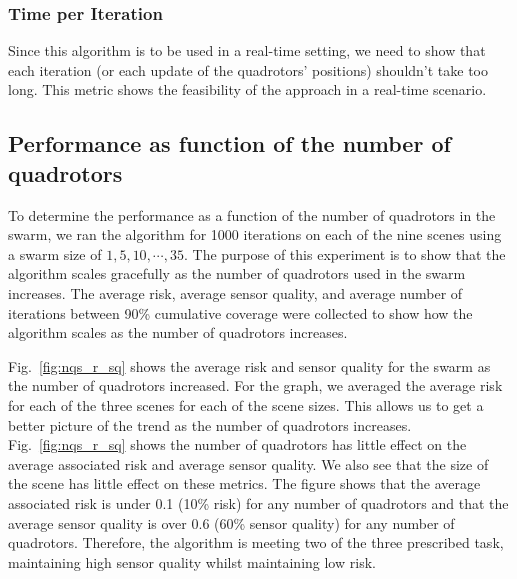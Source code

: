 \documentclass{article}
\begin{document}
\subsubsection{Time per Iteration}

Since this algorithm is to be used in a real-time setting, we need to show that
each iteration (or each update of the quadrotors' positions) shouldn't take too
long. This metric shows the feasibility of the approach in a real-time
scenario.

\subsection{Performance as function of the number of quadrotors}

To determine the performance as a function of the number of quadrotors in the
swarm, we ran the algorithm for 1000 iterations on each of the nine scenes
using a swarm size of $1, 5, 10, \cdots, 35$. The purpose of this experiment is
to show that the algorithm scales gracefully as the number of quadrotors used
in the swarm increases. The average risk, average sensor quality, and average
number of iterations between 90\% cumulative coverage were collected to show
how the algorithm scales as the number of quadrotors increases.

Fig.~\ref{fig:nqs_r_sq} shows the average risk and sensor quality for the swarm
as the number of quadrotors increased. For the graph, we averaged the average
risk for each of the three scenes for each of the scene sizes. This allows us
to get a better picture of the trend as the number of quadrotors increases.
Fig.~\ref{fig:nqs_r_sq} shows the number of quadrotors has little effect on the
average associated risk and average sensor quality. We also see that the size
of the scene has little effect on these metrics. The figure shows that the
average associated risk is under 0.1 (10\% risk) for any number of quadrotors
and that the average sensor quality is over 0.6 (60\% sensor quality) for any
number of quadrotors. Therefore, the algorithm is meeting two of the three
prescribed task, maintaining high sensor quality whilst maintaining low risk.
\end{document}
